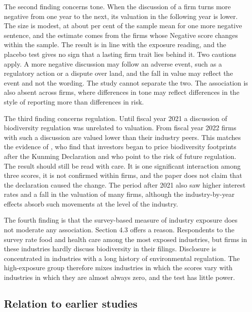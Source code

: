 \documentclass[12pt,a4paper]{article}
\begin{document}
The second finding concerns tone. When the discussion of a firm turns more negative from one year to the next, its valuation in the following year is lower. The size is modest, at about \effNegMean{} per cent of the sample mean for one more negative sentence, and the estimate comes from the \nChangeNeg{} firms whose Negative score changes within the sample. The result is in line with the exposure reading, and the placebo test gives no sign that a lasting firm trait lies behind it. Two cautions apply. A more negative discussion may follow an adverse event, such as a regulatory action or a dispute over land, and the fall in value may reflect the event and not the wording. The study cannot separate the two. The association is also absent across firms, where differences in tone may reflect differences in the style of reporting more than differences in risk.

The third finding concerns regulation. Until fiscal year 2021 a discussion of biodiversity regulation was unrelated to valuation. From fiscal year 2022 firms with such a discussion are valued lower than their industry peers. This matches the evidence of \citet{garel2024}, who find that investors began to price biodiversity footprints after the Kunming Declaration and who point to the risk of future regulation. The result should still be read with care. It is one significant interaction among three scores, it is not confirmed within firms, and the paper does not claim that the declaration caused the change. The period after 2021 also saw higher interest rates and a fall in the valuation of many firms, although the industry-by-year effects absorb such movements at the level of the industry.

The fourth finding is that the survey-based measure of industry exposure does not moderate any association. Section 4.3 offers a reason. Respondents to the survey rate food and health care among the most exposed industries, but firms in these industries hardly discuss biodiversity in their filings. Disclosure is concentrated in industries with a long history of environmental regulation. The high-exposure group therefore mixes industries in which the scores vary with industries in which they are almost always zero, and the test has little power.

\subsection{Relation to earlier studies}
\end{document}
